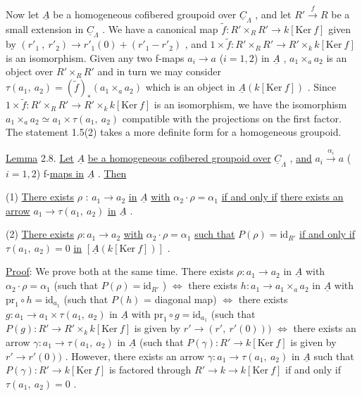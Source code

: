 Now let  $\underline{A}$  be a homogeneous cofibered groupoid over  $\underline{C}_{\Lambda}$  , and let  $R' \xrightarrow{\ f\ } R$  be a small extension in  $\underline{C}_{\Lambda}$  . We have a canonical map
$\tilde{f} : R' \times_{R} R' \longrightarrow k[\mathrm{Ker}\ f]$  given by  $(r'_{1}\ ,\ r'_{2}) \longrightarrow r'_{1}(0) + (r'_{1} - r'_{2})$  , and  $1 \times \tilde{f} : R' \times_{R} R' \longrightarrow R' \times_{k} k[\mathrm{Ker}\ f]$  is an isomorphism. Given any two f-maps  $a_{i} \to a$  ($i=1,2$) in  $\underline{A}$  ,  $a_{1} \times_{a} a_{2}$  is an object over  $R' \times_{R} R'$  and in turn we may consider  $\tau(a_{1},\ a_{2}) = (\tilde{f})_{*}(a_{1} \times_{a} a_{2})$  which is an object in  $\underline{A}(k[\mathrm{Ker}\ f])$  . Since  $1 \times \tilde{f} : R' \times_{R} R' \longrightarrow R' \times_{k} k[\mathrm{Ker}\ f]$  is an isomorphism, we have the isomorphism  $a_{1} \times_{a} a_{2} \simeq a_{1} \times \tau(a_{1},\ a_{2})$  compatible with the projections on the first factor. The statement 1.5(2) takes a more definite form for a homogeneous groupoid.

\underline{Lemma} 2.8.  \underline{Let}  $\underline{A}$  \underline{be a homogeneous cofibered groupoid over}  $\underline{C}_{\Lambda}$  , \underline{and}  $a_{i} \xrightarrow{\ \alpha_{i}\ } a$  ($i = 1, 2$)  f-\underline{maps in}  $\underline{A}$  . \underline{Then}

(1)  \underline{There exists}  $\rho$  : $a_{1} \to a_{2}$  \underline{in}  $\underline{A}$  \underline{with}  $\alpha_{2} \cdot \rho = \alpha_{1}$  \underline{if and only if} \underline{there exists an arrow}  $a_{1} \to \tau(a_{1},\ a_{2})$  \underline{in}  $\underline{A}$  .

(2)  \underline{There exists}  $\rho : a_{1} \to a_{2}$  \underline{with}  $\alpha_{2} \cdot \rho = \alpha_{1}$  \underline{such that}  $P(\rho) = \mathrm{id}_{R'}$ \underline{if and only if}  $\tau(a_{1},\ a_{2}) = 0$  \underline{in}  $[\underline{A}(k[\mathrm{Ker}\ f])]$  .

\underline{Proof}:  We prove both at the same time. There exists  $\rho : a_{1} \to a_{2}$  in  $\underline{A}$  with  $\alpha_{2} \cdot \rho = \alpha_{1}$  (such that  $P(\rho) = \mathrm{id}_{R'}$ )  $\Leftrightarrow$  there exists  $h : a_{1} \to a_{1} \times_{a} a_{2}$  in  $\underline{A}$  with  $\mathrm{pr}_{1} \circ h = \mathrm{id}_{a_{1}}$  (such that  $P(h)$ = diagonal map)  $\Leftrightarrow$ there exists  $g : a_{1} \to a_{1} \times \tau(a_{1},\ a_{2})$  in  $\underline{A}$  with  $\mathrm{pr}_{1} \circ g = \mathrm{id}_{a_{1}}$  (such that  $P(g) : R' \to R' \times_{k} k[\mathrm{Ker}\ f]$  is given by  $r' \to (r',\ r'(0)))$  $\Leftrightarrow$ there exists an arrow  $\gamma : a_{1} \to \tau(a_{1},\ a_{2})$  in  $\underline{A}$  (such that  $P(\gamma) : R' \to k[\mathrm{Ker}\ f]$  is given by  $r' \to r'(0))$  . However, there exists an arrow  $\gamma : a_{1} \to \tau(a_{1},\ a_{2})$  in  $\underline{A}$  such that  $P(\gamma) : R' \to k[\mathrm{Ker}\ f]$  is factored through  $R' \to k \to k[\mathrm{Ker}\ f]$  if and only if  $\tau(a_{1},\ a_{2}) = 0$  .

